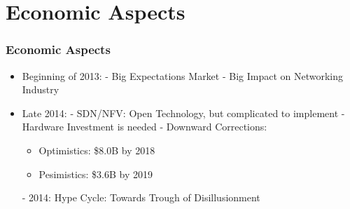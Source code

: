 \section{Economic Aspects}

\begin{frame}[allowframebreaks]
\frametitle{Economic Aspects}

\begin{itemize}
 \item Beginning of 2013:\linebreak
	- Big Expectations Market\linebreak
 - Big Impact on Networking Industry
 \item Late 2014:\linebreak
	- SDN/NFV: Open Technology, but complicated to implement\linebreak
	- Hardware Investment is needed\linebreak
	- Downward Corrections:
   \begin{itemize}
   \item Optimistics: \$8.0B by 2018
   \item Pesimistics: \$3.6B by 2019
   \end{itemize}
	- 2014: Hype Cycle: Towards Trough of Disillusionment
\end{itemize}

\end{frame}
